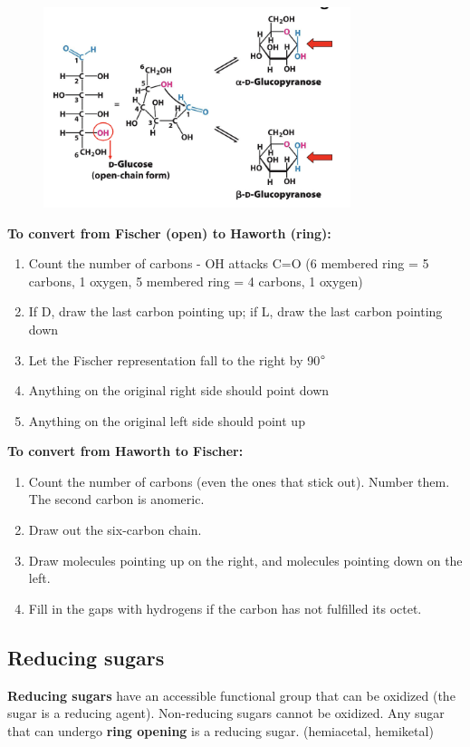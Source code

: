 \documentclass[letterpaper, 12pt]{article}
\begin{document}
\begin{figure}[H]
\centering
\includegraphics[width=0.8\textwidth]{projections}
\end{figure}

\textbf{To convert from Fischer (open) to Haworth (ring):}

\begin{enumerate}
\item Count the number of carbons - OH attacks C=O (6 membered ring = 5 carbons, 1 oxygen, 5 membered ring = 4 carbons, 1 oxygen)
\item If D, draw the last carbon pointing up; if L, draw the last carbon pointing down
\item Let the Fischer representation fall to the right by 90$\degree$
\item Anything on the original right side should point down
\item Anything on the original left side should point up
\end{enumerate}

\textbf{To convert from Haworth to Fischer:}

\begin{enumerate}
\item Count the number of carbons (even the ones that stick out). Number them. The second carbon is anomeric.
\item Draw out the six-carbon chain.
\item Draw molecules pointing up on the right, and molecules pointing down on the left.
\item Fill in the gaps with hydrogens if the carbon has not fulfilled its octet.
\end{enumerate}

\subsection*{Reducing sugars}
\textbf{Reducing sugars} have an accessible functional group that can be oxidized (the sugar is a reducing agent). Non-reducing sugars cannot be oxidized. Any sugar that can undergo \textbf{ring opening} is a reducing sugar. (hemiacetal, hemiketal)
\end{document}
